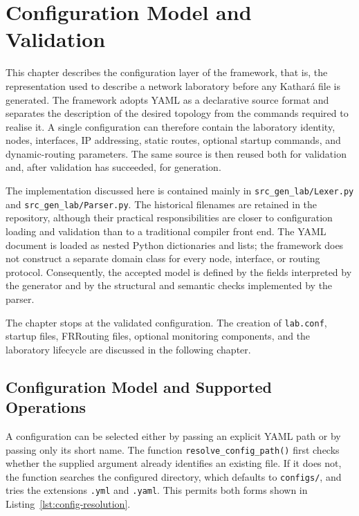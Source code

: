 \chapter{Configuration Model and Validation}
\label{chap:configuration-validation}

This chapter describes the configuration layer of the framework, that is, the
representation used to describe a network laboratory before any Kathar\'a file
is generated. The framework adopts YAML as a declarative source format
\cite{yaml122} and separates the description of the desired topology from the
commands required to realise it. A single configuration can therefore contain the laboratory
identity, nodes, interfaces, IP addressing, static routes, optional startup
commands, and dynamic-routing parameters. The same source is then reused both
for validation and, after validation has succeeded, for generation.

The implementation discussed here is contained mainly in
\texttt{src\_gen\_lab/Lexer.py} and \texttt{src\_gen\_lab/Parser.py}. The
historical filenames are retained in the repository, although their practical
responsibilities are closer to configuration loading and validation than to a
traditional compiler front end. The YAML document is loaded as nested Python
dictionaries and lists; the framework does not construct a separate domain
class for every node, interface, or routing protocol. Consequently, the
accepted model is defined by the fields interpreted by the generator and by
the structural and semantic checks implemented by the parser.

The chapter stops at the validated configuration. The creation of
\texttt{lab.conf}, startup files, FRRouting files, optional monitoring
components, and the laboratory lifecycle are discussed in the following
chapter.

\section{Configuration Model and Supported Operations}
\label{sec:configuration-model-purpose}

A configuration can be selected either by passing an explicit YAML path or by
passing only its short name. The function \texttt{resolve\_config\_path()} first
checks whether the supplied argument already identifies an existing file. If
it does not, the function searches the configured directory, which defaults to
\texttt{configs/}, and tries the extensions \texttt{.yml} and \texttt{.yaml}.
This permits both forms shown in Listing~\ref{lst:config-resolution}.

